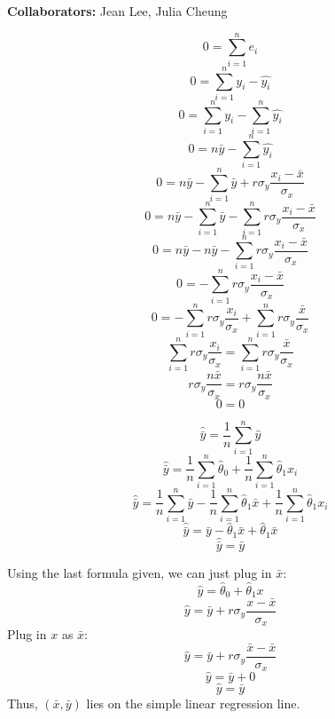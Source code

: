 \documentclass[11pt]{article}
\begin{document}
\textbf{Collaborators:} Jean Lee, Julia Cheung


\begin{Parts}
	\item 
	\begin{Answer}
		$$0 = \sum_{i = 1}^ne_i$$
		$$0 = \sum_{i = 1}^ny_i - \hat{y_i}$$
		$$0 = \sum_{i = 1}^ny_i - \sum_{i = 1}^n\hat{y_i}$$
		$$0 = n\bar{y} - \sum_{i = 1}^n\hat{y_i}$$
		$$0 = n\bar{y} - \sum_{i = 1}^n\bar{y} + r\sigma_y\frac{x_i - \bar{x}}{\sigma_x}$$
		$$0 = n\bar{y} - \sum_{i = 1}^n\bar{y} - \sum_{i = 1}^nr\sigma_y\frac{x_i - \bar{x}}{\sigma_x}$$
		$$0 = n\bar{y} - n\bar{y} - \sum_{i = 1}^nr\sigma_y\frac{x_i - \bar{x}}{\sigma_x}$$
		$$0 = - \sum_{i = 1}^nr\sigma_y\frac{x_i - \bar{x}}{\sigma_x}$$
		$$0 = - \sum_{i = 1}^nr\sigma_y\frac{x_i}{\sigma_x} + \sum_{i = 1}^nr\sigma_y\frac{\bar{x}}{\sigma_x}$$
		$$\sum_{i = 1}^nr\sigma_y\frac{x_i}{\sigma_x} = \sum_{i = 1}^nr\sigma_y\frac{\bar{x}}{\sigma_x}$$
		$$r\sigma_y\frac{n\bar{x}}{\sigma_x} = r\sigma_y\frac{n\bar{x}}{\sigma_x}$$
		$$0 = 0$$
	\end{Answer}
	\newpage
	\item
	\begin{Answer}
		$$\hat{\bar{y}} = \frac{1}{n}\sum^n_{i = 1}\hat{y}$$
		$$\hat{\bar{y}} = \frac{1}{n}\sum^n_{i = 1}\hat{\theta}_0 + \frac{1}{n}\sum^n_{i = 1}\hat{\theta}_1x_i$$
		$$\hat{\bar{y}} = \frac{1}{n}\sum^n_{i = 1}\bar{y} - \frac{1}{n}\sum^n_{i = 1}\hat{\theta}_1\bar{x} + \frac{1}{n}\sum^n_{i = 1}\hat{\theta}_1x_i$$
		$$\hat{\bar{y}} = \bar{y} - \hat{\theta}_1\bar{x} + \hat{\theta}_1\bar{x}$$
		$$\hat{\bar{y}} = \bar{y}$$
	\end{Answer}
	\item
	\begin{Answer}
		Using the last formula given, we can just plug in $\bar{x}$:
		$$\hat{y} = \hat{\theta}_0 + \hat{\theta}_1x$$
		$$\hat{y} = \bar{y} + r\sigma_y\frac{x - \bar{x}}{\sigma_x}$$
		Plug in $x$ as $\bar{x}$:
		$$\hat{y} = \bar{y} + r\sigma_y\frac{\bar{x} - \bar{x}}{\sigma_x}$$
		$$\hat{y} = \bar{y} + 0$$
		$$\hat{y} = \bar{y}$$
		Thus, $(\bar{x}, \bar{y})$ lies on the simple linear regression line.
	\end{Answer}
\end{Parts}
\end{document}
